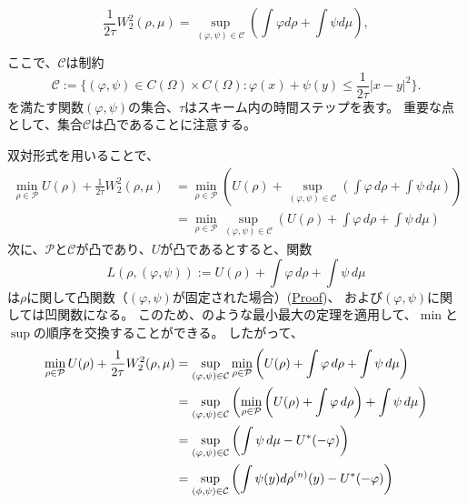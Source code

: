 \begin{equation}
    \label{eq:wasserstein dual}
    \frac{1}{2\tau} W_2^2(\rho, \mu) = \sup_{(\varphi, \psi) \in \mathcal{C}} \left( \int \varphi d\rho + \int \psi d\mu \right),
\end{equation}

ここで、$\mathcal{C}$は制約
\[
    \mathcal{C}  := \{(\varphi, \psi) \in C(\Omega) \times C(\Omega) : \varphi(x) + \psi(y) \leq \frac{1}{2 \tau} |x - y|^2 \}. 
\]
を満たす関数$(\varphi, \psi)$の集合、$\tau$はスキーム内の時間ステップを表す。
重要な点として、集合$\mathcal{C}$は凸であることに注意する。

双対形式を用いることで、
\begin{align*}
    \min_{\rho \in \mathcal{P}} U(\rho) + \frac{1}{2\tau} W_2^2(\rho, \mu) &= \min_{\rho \in \mathcal{P}} \left(U(\rho) + \sup_{(\varphi, \psi) \in \mathcal{C}} \left(\int \varphi \, d\rho + \int \psi \, d\mu\right)\right)\\
                                                                            &= \min_{\rho \in \mathcal{P}} \sup_{(\varphi, \psi) \in \mathcal{C}} \left(U(\rho) + \int \varphi \, d\rho + \int \psi \, d\mu\right)
  \end{align*}
  次に、\(\mathcal{P}\)と\(\mathcal{C}\)が凸であり、\(U\)が凸であるとすると、関数
  \[
    \label{eq:L}
    L(\rho, (\varphi, \psi)) := U(\rho) + \int \varphi \, d\rho + \int \psi \, d\mu
  \]
  は\hypertarget{rho_convex}{\(\rho\)に関して凸関数}（\((\varphi, \psi)\)が固定された場合）(\hyperlink{Proof:rho_convex}{Proof})、
  および\hypertarget{varphipsi_concave}{\((\varphi, \psi)\)に関しては凹関数}になる。
  このため、\cite[Prop. 2.4 (p176)]{MR1727362}のような最小最大の定理を適用して、\(\min\)と\(\sup\)の順序を交換することができる。
  したがって、
  \begin{align}
    \label{eq:dual}
    \min_{\rho \in \mathcal{P}} U(\rho) + \frac{1}{2\tau} W_2^2(\rho, \mu) &= \sup_{(\varphi, \psi) \in \mathcal{C}} \min_{\rho \in \mathcal{P}} \left(U(\rho) + \int \varphi \, d\rho + \int \psi \, d\mu \right)  \notag\\
                                                                            &= \sup_{(\varphi, \psi) \in \mathcal{C}} \left(\min_{\rho \in \mathcal{P}} \left(U(\rho) + \int \varphi \, d\rho\right) + \int \psi \, d\mu\right)  \notag\\
                                                                            &= \sup_{(\varphi, \psi) \in \mathcal{C}} \left(\int \psi \, d\mu - U^*(- \varphi)\right)  \\
                                                                            &= \sup_{(\phi,\psi) \in \mathcal{C}} \left( \int \psi(y) d\rho^{(n)}(y) - U^*(- \varphi) \right)\notag
  \end{align}
